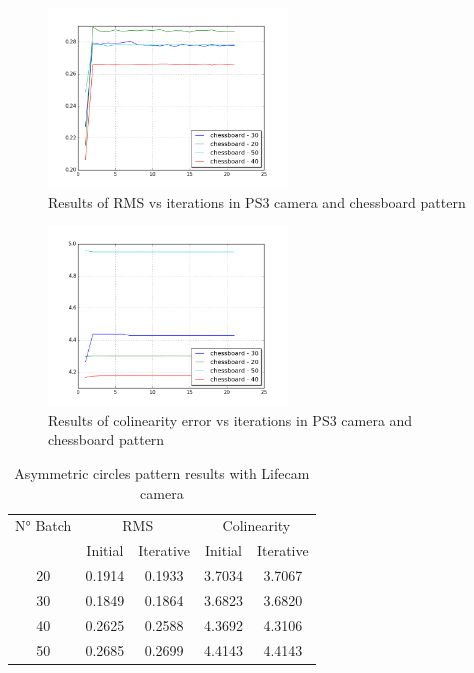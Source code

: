 \documentclass[journal]{IEEEtran}
\begin{document}
\begin{figure}[H]
\centering
\includegraphics[width=2.5in]{_img/report_4/img_results_ps3_chessboard.png}
\caption{Results of RMS vs iterations in PS3 camera and chessboard pattern}
\end{figure}

\begin{figure}[H]
\centering
\includegraphics[width=2.5in]{_img/report_4/img_results_ps3_colinearity_chessboard.png}
\caption{Results of colinearity error vs iterations in PS3 camera and chessboard pattern}
\end{figure}

\begin{table}[h]
\centering
\caption{Asymmetric circles pattern results with Lifecam camera}
\begin{tabular}{ |c||c|c|c|c|  }
 \hline
 N° Batch & \multicolumn{2}{c|}{RMS} & \multicolumn{2}{c|}{Colinearity}\\
 \cline{2-5}
 & Initial & Iterative & Initial & Iterative \\
 \hline
 20        & 0.1914 & 0.1933 & 3.7034 & 3.7067 \\
 30        & 0.1849 & 0.1864 & 3.6823 & 3.6820 \\
 40        & 0.2625 & 0.2588 & 4.3692 & 4.3106 \\
 50        & 0.2685 & 0.2699 & 4.4143 & 4.4143 \\
 \hline
\end{tabular}
\\
\end{table}
\end{document}
